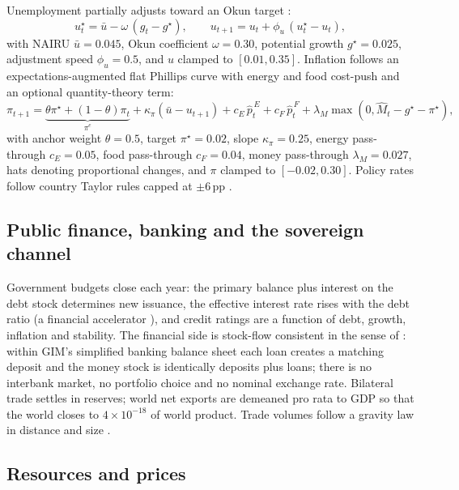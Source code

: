 \documentclass[12pt,a4paper]{article}
\begin{document}
Unemployment partially adjusts toward an Okun target \citep{okun1962}:
\begin{equation}
u^{\star}_t = \bar u - \omega\,(g_t - g^{\star}),\qquad
u_{t+1} = u_t + \phi_u\,(u^{\star}_t - u_t),
\label{eq:okun}
\end{equation}
with NAIRU $\bar u = 0.045$, Okun coefficient $\omega=0.30$, potential growth
$g^{\star}=0.025$, adjustment speed $\phi_u=0.5$, and $u$ clamped to $[0.01,0.35]$. Inflation
follows an expectations-augmented flat Phillips curve \citep{phillips1958} with energy and
food cost-push and an optional quantity-theory term:
\begin{equation}
\pi_{t+1} = \underbrace{\theta\pi^{\star}+(1-\theta)\pi_t}_{\pi^{e}}
          + \kappa_\pi(\bar u - u_{t+1})
          + c_E\,\widehat{p}^{\,E}_t + c_F\,\widehat{p}^{\,F}_t
          + \lambda_M\max(0,\widehat{M}_t - g^{\star}-\pi^{\star}),
\label{eq:phillips}
\end{equation}
with anchor weight $\theta=0.5$, target $\pi^{\star}=0.02$, slope $\kappa_\pi=0.25$,
energy pass-through $c_E=0.05$, food pass-through $c_F=0.04$, money pass-through
$\lambda_M=0.027$, hats denoting proportional changes, and $\pi$ clamped to $[-0.02,0.30]$.
Policy rates follow country Taylor rules capped at $\pm6$\,pp \citep{taylor1993}.

\subsection{Public finance, banking and the sovereign channel}

Government budgets close each year: the primary balance plus interest on the debt stock
determines new issuance, the effective interest rate rises with the debt ratio (a financial
accelerator \citep{bernanke1999}), and credit ratings are a function of debt, growth,
inflation and stability. The financial side is stock-flow consistent in the sense of
\citet{godley2007}: within GIM's simplified banking balance sheet each loan creates a matching
deposit and the money stock is identically deposits plus loans; there is no interbank market,
no portfolio choice and no nominal exchange rate. Bilateral trade settles in reserves; world
net exports are demeaned pro rata to GDP so that the world closes to $4\times10^{-18}$ of
world product. Trade volumes follow a gravity law in distance and size
\citep{headmayer2014}.

\subsection{Resources and prices}
\end{document}
